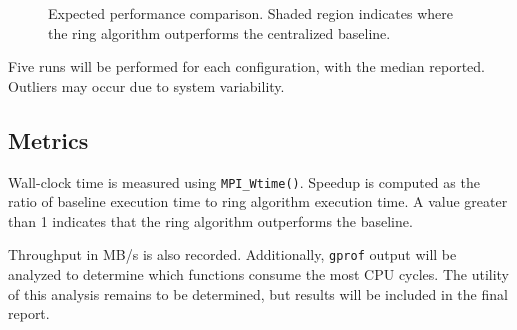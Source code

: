 \documentclass[12pt,a4paper]{article}
\begin{document}
\begin{figure}[h]
\centering
{}
\caption{Expected performance comparison. Shaded region indicates where the ring algorithm outperforms the centralized baseline.}
\label{fig:expected}
\end{figure}

Five runs will be performed for each configuration, with the median reported. Outliers may occur due to system variability.

\subsection{Metrics}

Wall-clock time is measured using \texttt{MPI\_Wtime()}. Speedup is computed as the ratio of baseline execution time to ring algorithm execution time. A value greater than 1 indicates that the ring algorithm outperforms the baseline.

Throughput in MB/s is also recorded. Additionally, \texttt{gprof} output will be analyzed to determine which functions consume the most CPU cycles. The utility of this analysis remains to be determined, but results will be included in the final report.
\end{document}
